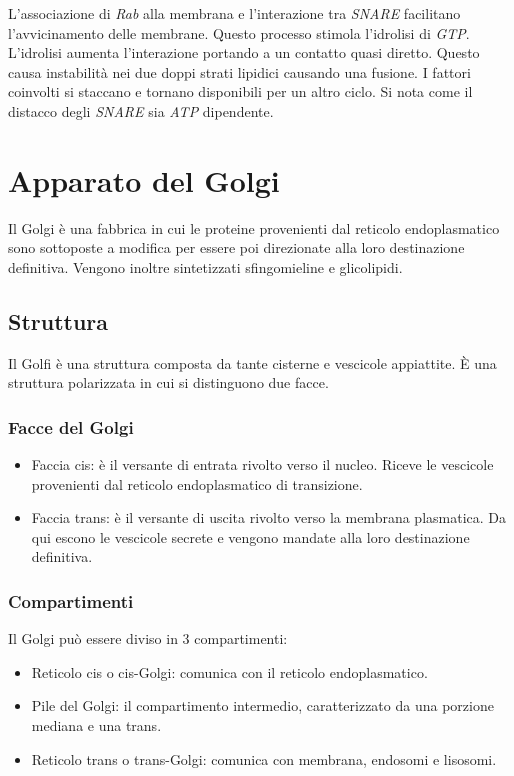 			L'associazione di \emph{Rab} alla membrana e l'interazione tra \emph{SNARE} facilitano l'avvicinamento delle membrane.
			Questo processo stimola l'idrolisi di \emph{GTP}.
			L'idrolisi aumenta l'interazione portando a un contatto quasi diretto.
			Questo causa instabilit\`a nei due doppi strati lipidici causando una fusione.
			I fattori coinvolti si staccano e tornano disponibili per un altro ciclo.
			Si nota come il distacco degli \emph{SNARE} sia \emph{ATP} dipendente.

\section{Apparato del Golgi}
Il Golgi \`e una fabbrica in cui le proteine provenienti dal reticolo endoplasmatico sono sottoposte a modifica per essere poi direzionate alla loro destinazione definitiva.
Vengono inoltre sintetizzati sfingomieline e glicolipidi.

	\subsection{Struttura}
	Il Golfi \`e una struttura composta da tante cisterne e vescicole appiattite.
	\`E una struttura polarizzata in cui si distinguono due facce.

		\subsubsection{Facce del Golgi}
		\begin{multicols}{2}
			\begin{itemize}
				\item Faccia cis: \`e il versante di entrata rivolto verso il nucleo.
					Riceve le vescicole provenienti dal reticolo endoplasmatico di transizione.
				\item Faccia trans: \`e il versante di uscita rivolto verso la membrana plasmatica.
					Da qui escono le vescicole secrete e vengono mandate alla loro destinazione definitiva.
			\end{itemize}
		\end{multicols}

		\subsubsection{Compartimenti}
		Il Golgi pu\`o essere diviso in $3$ compartimenti:
		\begin{multicols}{2}
			\begin{itemize}
				\item Reticolo cis o cis-Golgi: comunica con il reticolo endoplasmatico.
				\item Pile del Golgi: il compartimento intermedio, caratterizzato da una porzione mediana e una trans.
				\item Reticolo trans o trans-Golgi: comunica con membrana, endosomi e lisosomi.
			\end{itemize}
		\end{multicols}

